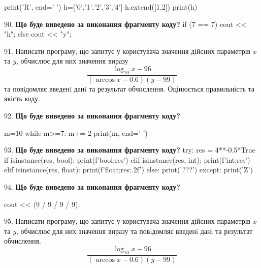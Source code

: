 \documentclass[11pt]{article}
\begin{document}
print('R', end=' ')
h=['0','1','2','3','4']
h.extend([1,2])
print(h)

\par\vspace{5mm}

90. \textbf{Що буде виведено за виконання фрагменту коду?}
if (7 == 7)
    cout << "h";
else
    cout << "y";

\par\vspace{5mm}

91. 
Написати програму, що запитує у користувача значення дійсних параметрів $x$ та $y$, обчислює для них значення виразу 
$$\frac{\log_{10} x - 96}{(\arccos x - 0.6) (y - 99)}$$ 
та повiдомляє введенi данi та результат обчислення.
 Оцінюється правильність та якість коду.

\par\vspace{5mm}

92. \textbf{Що буде виведено за виконання фрагменту коду?}

m=10
while m>=7:
    m+=-2
print(m, end=' ')

\par\vspace{5mm}

93. \textbf{Що буде виведено за виконання фрагменту коду?}
try:
    res = 4**-0.5*True
    if isinstance(res, bool):
        print(f'bool;{res}')
    elif isinstance(res, int):
        print(f'int;{res}')
    elif isinstance(res, float):
        print(f'float;{res:.2f}')
    else:
        print('???')
except:
    print('Z')
\par\vspace{5mm}

94. \textbf{Що буде виведено за виконання фрагменту коду?}

cout << (9 / 9 / 9 / 9);
\par\vspace{5mm}

95. 
Написати програму, що запитує у користувача значення дійсних параметрів $x$ та $y$, обчислює для них значення виразу та повiдомляє введенi данi та результат обчислення.
$$\frac{\log_{10} x - 96}{(\arccos x - 0.6) (y - 99)}$$ 

\par\vspace{5mm}
\end{document}
